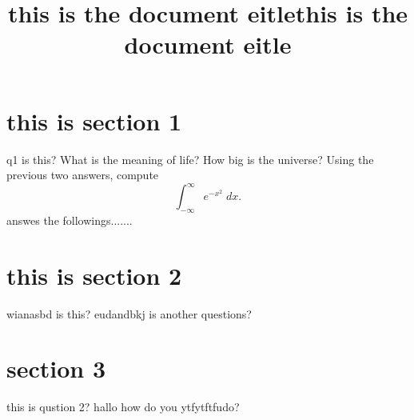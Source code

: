 \documentclass{exam}
\title{this is the document eitle}
\begin{document}
\title{this is the document eitle}
\section*{this is section 1}
\begin{questions}
	\pointsdroppedatright
	\question [4]q1 is this?\droppoints
	\question[1] What is the meaning of life?\droppoints
	\question[2] How big is the universe? \droppoints
	\question[5]
	Using the previous two answers, compute
	\[
		\int_{-\infty}^{\infty} e^{-x^2}\;dx.
	\]\droppoints
	\question[9] answes the followings.......

\end{questions}
\section{this is section 2}
\begin{questions}
	\question wianasbd is this?
	\question eudandbkj is another questions?
\end{questions}

\section*{section 3}
\begin{questions}
	\question[23] this is qustion 2? \droptotalpoints
	\question[30] hallo how do you ytfytftfudo?\droppoints
\end{questions}
\end{document}
